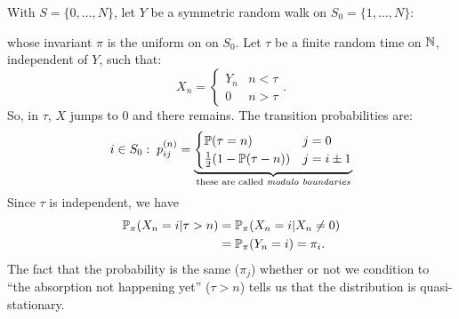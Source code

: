 \documentclass{article}
\begin{document}
\begin{example}
    With $S=\{0,\dots,N\}$, let $Y$ be a symmetric random walk on $S_0=\{1,\ldots,N\}$:
\begin{figure}[H]
    \centering
    \label{symmrw}
\end{figure} whose invariant $\pi$ is the uniform on on $S_0$. Let $\tau$ be a finite random time on $\mathbb{N}$, independent of $Y$, such that:
\[
X_n=\begin{cases}
    Y_n &n<\tau\\
    0 &n>\tau
\end{cases}.
\]
So, in $\tau$, $X$ jumps to 0 and there remains. The transition probabilities are:
\[
i \in S_0:\;p_{ij}^{(n)}=\underbrace{\begin{cases}
    \mathbb{P}(\tau=n)&j=0\\
    \frac{1}{2}(1-\mathbb{P}(\tau-n)) &j=i\pm 1
\end{cases}}_{\text{these are called \textit{modulo boundaries}}}
\]
Since $\tau$ is independent, we have 
\begin{align*}
    \mathbb{P}_{\pi}(X_n=i|\tau>n)&=\mathbb{P}_{\pi}(X_n=i|X_n\neq0)\\
    &=\mathbb{P}_{\pi}(Y_n=i)=\pi_i.
\end{align*}
The fact that the probability is the same ($\pi_j$) whether or not we condition to ``the absorption not happening yet'' ($\tau>n$) tells us that the distribution is quasi-stationary.
\end{example}
\end{document}
